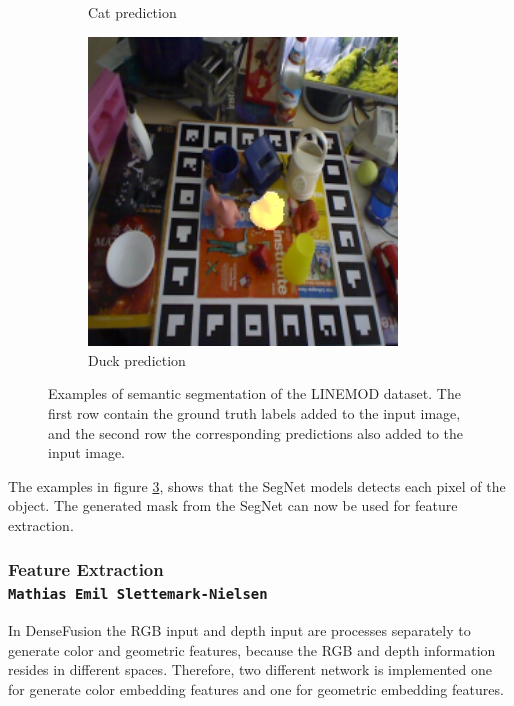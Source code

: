 \documentclass[../main.tex]{subfiles}
\begin{document}
\begin{figure}[H]
\begin{subfigure}[t]{0.19\textwidth}
        \caption{Cat prediction}
        \label{subfig:cat_prediction}
    \end{subfigure}
    \begin{subfigure}[t]{0.19\textwidth}
        \centering
        \captionsetup{width=.9\textwidth}
        \includegraphics[width=0.9\textwidth]{figures/segmentation/duck_prediction.png}
        \caption{Duck prediction}
        \label{subfig:duck_prediction}
    \end{subfigure}
    \caption{Examples of semantic segmentation of the LINEMOD dataset. The first row contain the ground truth labels added to the input image, and the second row the corresponding predictions also added to the input image.}
    \label{fig:segmentation_example}
\end{figure}

The examples in figure \ref{fig:segmentation_example}, shows that the SegNet models detects each pixel of the object. The generated mask from the SegNet can now be used for feature extraction.

\subsubsection{Feature Extraction\\ \normalfont\normalsize\texttt{Mathias Emil Slettemark-Nielsen}} \label{subsubsec:feature_extration}
In DenseFusion the RGB input and depth input are processes separately to generate color and geometric features, because the RGB and depth information resides in different spaces. Therefore, two different network is implemented one for generate color embedding features and one for geometric embedding features.
\end{document}
